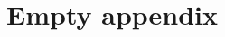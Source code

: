 \documentclass[../CGMPortfolio.tex]{subfiles}
\begin{document}
\section{Empty appendix}
\end{document}
